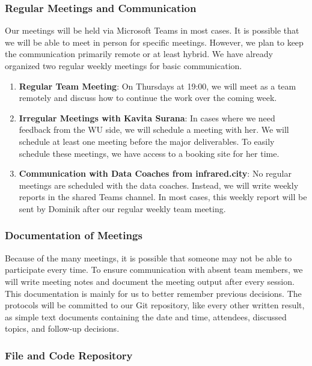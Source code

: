 \documentclass[12pt]{article}
\begin{document}
\subsubsection{Regular Meetings and Communication}

Our meetings will be held via Microsoft Teams in most cases. It is possible that we will be able to meet in person for specific meetings. However, we plan to keep the communication primarily remote or at least hybrid. We have already organized two regular weekly meetings for basic communication.

\begin{enumerate}
    \item \textbf{Regular Team Meeting}: On Thursdays at 19:00, we will meet as a team remotely and discuss how to continue the work over the coming week.
    \item \textbf{Irregular Meetings with Kavita Surana}: In cases where we need feedback from the WU side, we will schedule a meeting with her. We will schedule at least one meeting before the major deliverables. To easily schedule these meetings, we have access to a booking site for her time.
    \item \textbf{Communication with Data Coaches from infrared.city}: No regular meetings are scheduled with the data coaches. Instead, we will write weekly reports in the shared Teams channel. In most cases, this weekly report will be sent by Dominik after our regular weekly team meeting.
\end{enumerate}

\subsubsection{Documentation of Meetings}

Because of the many meetings, it is possible that someone may not be able to participate every time. To ensure communication with absent team members, we will write meeting notes and document the meeting output after every session. This documentation is mainly for us to better remember previous decisions. The protocols will be committed to our Git repository, like every other written result, as simple text documents containing the date and time, attendees, discussed topics, and follow-up decisions.  

\subsubsection{File and Code Repository}
\end{document}
